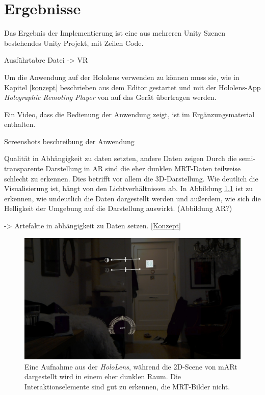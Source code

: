 

\chapter{Ergebnisse}
\label{ergebnisse}


Das Ergebnis der Implementierung ist eine aus mehreren Unity Szenen bestehendes Unity Projekt, mit  Zeilen Code. 

Ausführtabre Datei -> VR

Um die Anwendung auf der Hololens verwenden zu können muss sie, wie in Kapitel \ref{konzept} beschrieben aus dem Editor gestartet und mit der Hololens-App \textit{Holographic Remoting Player} von auf das Gerät übertragen werden. 



Ein Video, dass die Bedienung der Anwendung zeigt, ist im Ergänzungsmaterial enthalten.

Screenshots
beschreibung der Anwendung

Qualität in Abhängigkeit zu daten setzten, andere Daten zeigen
Durch die semi-transparente Darstellung in AR sind die eher dunklen MRT-Daten teilweise schlecht zu erkennen. Dies betrifft vor allem die 3D-Darstellung. Wie deutlich die Visualisierung ist, hängt von den Lichtverhältnissen ab. In Abbildung \ref{img:ARLicht} ist zu erkennen, wie undeutlich die Daten dargestellt werden und außerdem, wie sich die Helligkeit der Umgebung auf die Darstellung auswirkt. (Abbildung AR?)

-> Artefakte in abhängigkeit zu Daten setzen. \ref{Konzept}

\begin{figure}[!htb]
	\centering
	\includegraphics[width=0.5\linewidth]{images/hololens2D.jpg}
	\caption{Eine Aufnahme aus der \textit{HoloLens}, während die 2D-Scene von mARt dargestellt wird in einem eher dunklen Raum. Die Interaktionselemente sind gut zu erkennen, die MRT-Bilder nicht.}
	\label{img:ARLicht}
\end{figure}
\FloatBarrier

